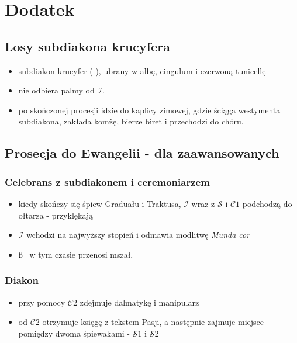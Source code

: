 \section{Dodatek}
	  \subsection{Losy subdiakona krucyfera}
	    \begin{itemize}
	    \item subdiakon krucyfer (  ), ubrany w albę, cingulum i czerwoną tunicellę 
	    \item nie odbiera palmy od $\mathcal{I}$. 
	    \item po skończonej procesji idzie do kaplicy zimowej, gdzie ściąga westymenta subdiakona, zakłada komżę, bierze biret i przechodzi do chóru.
	    \end{itemize}
    
  
  \subsection{Prosecja do Ewangelii - dla zaawansowanych}
  \label{E}
    \subsubsection*{\textbf{Celebrans z subdiakonem i ceremoniarzem }}
      \begin{itemize}
      \item kiedy skończy się śpiew Graduału i Traktusa, $\mathcal{I}$ wraz z $\mathcal{S}$ i $\mathcal{C}1$ podchodzą do ołtarza - przyklękają 
      \item $\mathcal{I}$ wchodzi na najwyższy stopień i odmawia modlitwę \textit{Munda cor} 
      \item \ss~ w tym czasie przenosi mszał,
      \end{itemize}
      
    \subsubsection*{\textbf{Diakon}}
      \begin{itemize}
       \item przy pomocy $\mathcal{C}2$ zdejmuje dalmatykę i manipularz 
       \item od $\mathcal{C}2$ otrzymuje księgę z tekstem Pasji, a następnie zajmuje miejsce pomiędzy dwoma śpiewakami - $\mathcal{S}1$ i $\mathcal{S}2$
      \end{itemize}
      
